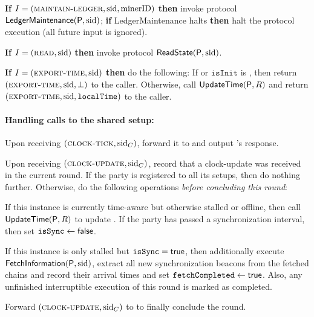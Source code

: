 \begin{cccProtocol}
\begin{cccItemize}[nosep]
        \item \textbf{If} $I = (\textsc{maintain-ledger}, \mathrm{sid}, \mathrm{minerID})$ \textbf{then} invoke protocol $\mathsf{LedgerMaintenance} (\mathsf{P}, \mathrm{sid})$; \textbf{if} \textsf{LedgerMaintenance} halts \textbf{then} halt the protocol execution (all future input is ignored).

        \item \textbf{If} $I = (\textsc{read}, \mathrm{sid})$ \textbf{then} invoke protocol $\textsf{ReadState}(\mathsf{P}, \mathrm{sid})$.

        \item \textbf{If} $I = (\textsc{export-time}, \mathrm{sid})$ \textbf{then} do the following:
        If \isSync or $\mathtt{isInit}$ is \false, then return $(\textsc{export-time}, \mathrm{sid}, \bot)$ to the caller.
        Otherwise, call $\textsf{UpdateTime}(\mathsf{P}, R)$ and return $(\textsc{export-time}, \mathrm{sid}, \mathtt{localTime})$ to the caller.
    \end{cccItemize}

    \paragraph{Handling calls to the shared setup:}
    \begin{cccItemize}[nosep]
        \item Upon receiving $(\textsc{clock-tick}, \mathrm{sid}_C)$, forward it to \funcImpClock and output \funcImpClock's response.

        \item Upon receiving $(\textsc{clock-update}, \mathrm{sid}_C)$, record that a clock-update was received in the current round.
        If the party is registered to all its setups, then do nothing further.
        Otherwise, do the following operations \textit{before concluding this round}:
        \begin{cccEnum}[nosep]
            \item If this instance is currently time-aware but otherwise stalled or offline, then call $\textsf{UpdateTime}(\mathsf{P}, R)$ to update \localTime.
            If the party has passed a synchronization interval, then set $\mathtt{isSync} \gets \mathsf{false}$.

            \item If this instance is only stalled but $\mathtt{isSync} = \mathsf{true}$, then additionally execute $\textsf{FetchInformation}(\mathsf{P}, \mathrm{sid})$, extract all new synchronization beacons from the fetched chains and record their arrival times and set $\mathtt{fetchCompleted} \gets \mathsf{true}$.
            Also, any unfinished interruptible execution of this round is marked as completed.

            \item Forward $(\textsc{clock-update}, \mathrm{sid}_C)$ to \funcImpClock to finally conclude the round.
        \end{cccEnum}
    \end{cccItemize}
\end{cccProtocol}